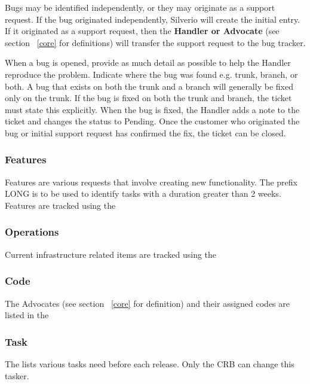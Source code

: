 Bugs may be identified independently, or they may originate as a support request. If the bug originated independently, Silverio will create the initial entry. If it originated as a support request, then the {\bf Handler or Advocate} (see section ~\ref{core} for definitions) will transfer the support request to the bug tracker. 

When a bug is opened, provide as much detail as possible to help the Handler reproduce the problem. Indicate where the bug was found e.g. trunk, branch, or both. A bug that exists on both the trunk and a branch will generally be fixed only on the trunk. If the bug is fixed on both the trunk and branch, the ticket must  state this explicitly. When the bug is fixed, the Handler adds a note to the ticket and changes the status to Pending. Once the customer who originated the bug or initial support request has confirmed the fix, the ticket can be closed. 

\subsubsection{Features}

Features are various requests that involve creating new functionality. The prefix LONG is to be used to identify tasks with a duration greater than 2 weeks. Features are tracked using the 

\subsubsection{Operations}
Current infrastructure related items are tracked using the 

\subsubsection{Code}
The Advocates (see section ~\ref{core} for definition) and their assigned codes are listed
in the 

\subsubsection{Task}
The  lists various tasks need before each release. Only the CRB can change this tasker. 


